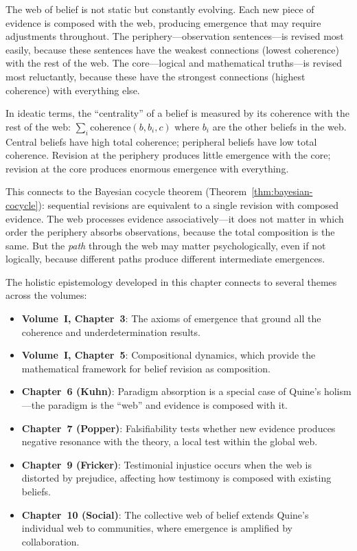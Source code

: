 \begin{remark}
The web of belief is not static but constantly evolving. Each new piece of evidence
is composed with the web, producing emergence that may require adjustments
throughout. The periphery---observation sentences---is revised most easily, because
these sentences have the weakest connections (lowest coherence) with the rest of the
web. The core---logical and mathematical truths---is revised most reluctantly,
because these have the strongest connections (highest coherence) with everything else.

In ideatic terms, the ``centrality'' of a belief is measured by its coherence
with the rest of the web: $\sum_i \mathrm{coherence}(b, b_i, c)$ where $b_i$
are the other beliefs in the web. Central beliefs have high total coherence;
peripheral beliefs have low total coherence. Revision at the periphery produces
little emergence with the core; revision at the core produces enormous emergence
with everything.

This connects to the Bayesian cocycle theorem (Theorem~\ref{thm:bayesian-cocycle}):
sequential revisions are equivalent to a single revision with composed evidence.
The web processes evidence associatively---it does not matter in which order the
periphery absorbs observations, because the total composition is the same. But
the \emph{path} through the web may matter psychologically, even if not logically,
because different paths produce different intermediate emergences.
\end{remark}

\begin{remark}
The holistic epistemology developed in this chapter connects to several themes
across the volumes:

\begin{itemize}
\item \textbf{Volume~I, Chapter~3}: The axioms of emergence that ground all
  the coherence and underdetermination results.
\item \textbf{Volume~I, Chapter~5}: Compositional dynamics, which provide the
  mathematical framework for belief revision as composition.
\item \textbf{Chapter~6 (Kuhn)}: Paradigm absorption is a special case of
  Quine's holism---the paradigm is the ``web'' and evidence is composed with it.
\item \textbf{Chapter~7 (Popper)}: Falsifiability tests whether new evidence
  produces negative resonance with the theory, a local test within the global web.
\item \textbf{Chapter~9 (Fricker)}: Testimonial injustice occurs when the web
  is distorted by prejudice, affecting how testimony is composed with existing beliefs.
\item \textbf{Chapter~10 (Social)}: The collective web of belief extends Quine's
  individual web to communities, where emergence is amplified by collaboration.
\end{itemize}
\end{remark}

